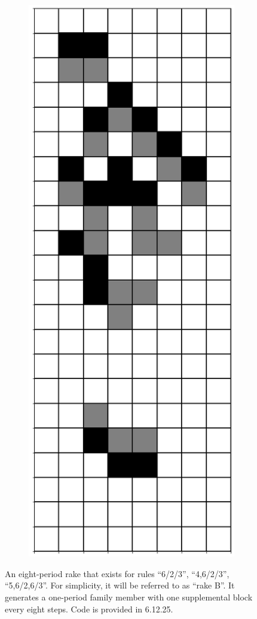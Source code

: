 \documentclass[12pt]{article}
\numberwithin{figure}{section} %
\begin{document}
\begin{figure}[H]
\begin{subfigure}{0.19\textwidth}
     \subcaption{}
   \end{subfigure}
           \begin{subfigure}{0.19\textwidth}
     \centering
     \includegraphics[width=\linewidth]{Section4/28.8}
     \subcaption{}
   \end{subfigure}

\caption{An eight-period rake that exists for rules “6/2/3”, “4,6/2/3”, “5,6/2,6/3”. For simplicity, it will be referred to as “rake B”. It generates a one-period family member with one supplemental block every eight steps. Code is provided in 6.12.25. }
\end{figure}
\end{document}
